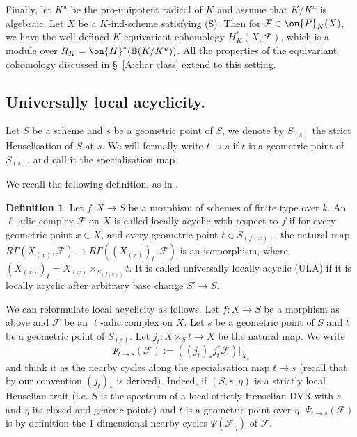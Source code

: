 \documentclass[]{pcmi}
\theoremstyle{plain}
\theoremstyle{remark}
\theoremstyle{definition}
\newtheorem{dfn}[equation]{Definition}
\newcommand{\bB}{{\mathbb B}}
\newcommand{\mF}{{\mathcal F}}
\begin{document}
Finally, let $K^u$ be the pro-unipotent radical of $K$ and assume that $K/K^u$ is algebraic. Let $X$ be a $K$-ind-scheme satisfying (S). Then for $\mF\in \on{P}_K(X)$, we have the well-defined $K$-equivariant cohomology $H_K^*(X,\mF)$, which is a module over $R_{K}=\on{H}^*(\bB (K/K^u))$. All the properties of the equivariant cohomology discussed in \S\ \ref{A:char class} extend to this setting.











\subsection{Universally local acyclicity.}\label{ULA sheaf}



Let $S$ be a scheme and $s$ be a geometric point of $S$, we denote by $S_{(s)}$ the strict Henselisation of $S$ at $s$.  We will formally write $t\to s$ if $t$ is a geometric point of $S_{(s)}$, and call it the specialisation map.


We recall the following definition, as in \cite[]{SGA4.5}. 
\begin{dfn}Let $f:X\to S$ be a morphism of schemes of finite type over $k$. An $\ell$-adic complex $\mF$ on $X$ is called locally acyclic with respect to $f$ if for every geometric point $x\in X$, and every geometric point $t\in S_{(f(x))}$, the natural map $R\Gamma(X_{(x)},\mF)\to R\Gamma( (X_{(x)})_t,\mF)$ is an isomorphism, where $(X_{(x)})_t=X_{(x)}\times_{S_{(f(x))}}t$. It is called universally locally acyclic (ULA) if it is locally acyclic after arbitrary base change $S'\to S$.
\end{dfn}

We can reformulate local acyclicity as follows.  Let $f:X\to S$ be a morphism as above and $\mF$ be an $\ell$-adic complex on $X$. Let $s$ be a geometric point of $S$ and $t$ be a geometric point of $S_{(s)}$. Let $j_t: X\times_{S} t\to X$ be the natural map. We write
\[\Psi_{t\to s}(\mF):= ((j_t)_*j_t^*\mF)|_{X_s} \]
and think it as the nearby cycles along the specialisation map $t\to s$ (recall that by our convention $(j_t)_*$ is derived). Indeed, if $(S,s,\eta)$ is a strictly local Henselian trait (i.e. $S$ is the spectrum of a local strictly Henselian DVR with $s$ and $\eta$ its closed and generic points)  and $t$ is a geometric point over $\eta$, $\Psi_{t\to s}(\mF)$ is by definition the 1-dimensional nearby cycles $\Psi(\mF_\eta)$ of $\mF$.
\end{document}
